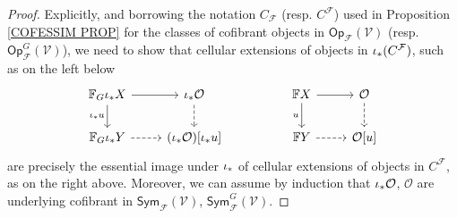 \documentclass[a4paper,10pt]{article}%
\begin{document}
\begin{proof}
Explicitly, and borrowing the notation
$C_{\mathcal{F}}$ (resp. $C^{\mathcal{F}}$) used in Proposition \ref{COFESSIM PROP} for the 
classes of cofibrant objects in 
$\mathsf{Op}_{\mathcal{F}}(\mathcal{V})$ 
(resp. $\mathsf{Op}_{\mathcal{F}}^G(\mathcal{V})$),
we need to show that cellular extensions of objects in 
$\iota_{\**}(C^{\mathcal{F}})$, such as on the left below
\begin{equation}\label{TWOCELLEXT EQ}
	\begin{tikzcd}
		\mathbb F_G \iota_{\**} X 
		\ar{d}[swap]{\iota_{\**}u} 
		\ar{r} 
	&
		\iota_{\**} \mathcal{O} 
		\ar[dashed]{d} 
	& &
		\mathbb{F} X 
		\ar{d}[swap]{u} 
		\ar{r} 
	&
		\mathcal{O} 
		\ar[dashed]{d}
\\
		\mathbb F_G \iota_{\**} Y
		\ar[dashed]{r}
	&
		(\iota_{\**} \mathcal{O})[\iota_{\**} u]
	& &
		\mathbb{F} Y 
		\ar[dashed]{r}
	&
		\mathcal{O}[u]
	\end{tikzcd}
\end{equation}
are precisely the essential image under $\iota_{\**}$ of cellular extensions of objects in $C^{\mathcal{F}}$, as on the right above.
Moreover, we can assume by induction that
$\iota_{\**} \mathcal{O}$,
$\mathcal{O}$
are underlying cofibrant in 
$\mathsf{Sym}_{\mathcal{F}}(\mathcal{V})$,
$\mathsf{Sym}^G_{\mathcal{F}}(\mathcal{V})$.
%
%
%

\end{proof}
\end{document}
